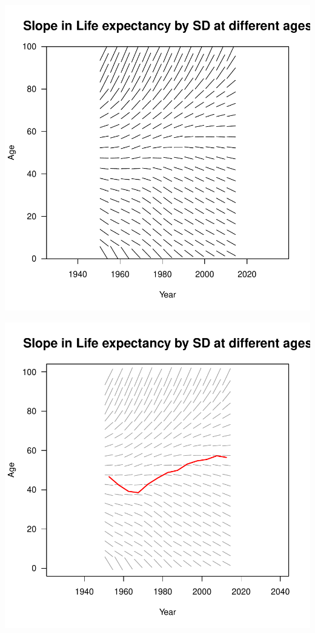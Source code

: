 \documentclass[xcolor={dvipsnames}]{beamer}
\begin{document}
\begin{frame}
		
			\begin{center}		
		\includegraphics[scale=.53]{Figures/Fig9}
				\end{center}
			
\end{frame}

\begin{frame}
		
			\begin{center}		
		\includegraphics[scale=.53]{Figures/Fig10}
				\end{center}
			
\end{frame}
\end{document}
